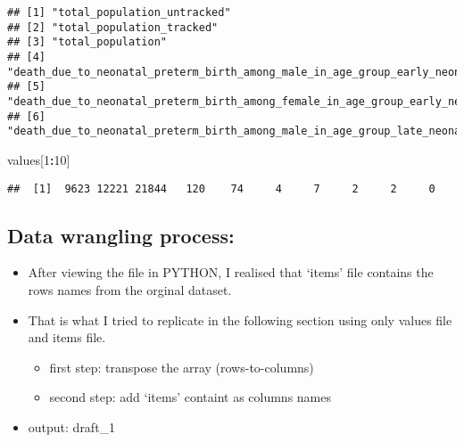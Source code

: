 \documentclass[]{article}
\newenvironment{Shaded}{\begin{snugshade}}{\end{snugshade}}
\newcommand{\DecValTok}[1]{\textcolor[rgb]{0.00,0.00,0.81}{#1}}
\newcommand{\NormalTok}[1]{#1}
\newcommand{\OperatorTok}[1]{\textcolor[rgb]{0.81,0.36,0.00}{\textbf{#1}}}
\newcommand{\StringTok}[1]{\textcolor[rgb]{0.31,0.60,0.02}{#1}}
\providecommand{\tightlist}{%
  \setlength{\itemsep}{0pt}\setlength{\parskip}{0pt}}
\begin{document}
\begin{Shaded}
\end{Shaded}

\begin{verbatim}
## [1] "total_population_untracked"                                                  
## [2] "total_population_tracked"                                                    
## [3] "total_population"                                                            
## [4] "death_due_to_neonatal_preterm_birth_among_male_in_age_group_early_neonatal"  
## [5] "death_due_to_neonatal_preterm_birth_among_female_in_age_group_early_neonatal"
## [6] "death_due_to_neonatal_preterm_birth_among_male_in_age_group_late_neonatal"
\end{verbatim}

\begin{Shaded}
\begin{Highlighting}[]
\NormalTok{values[}\DecValTok{1}\OperatorTok{:}\DecValTok{10}\NormalTok{]}
\end{Highlighting}
\end{Shaded}

\begin{verbatim}
##  [1]  9623 12221 21844   120    74     4     7     2     2     0
\end{verbatim}

\hypertarget{data-wrangling-process}{%
\subsection{Data wrangling process:}\label{data-wrangling-process}}

\begin{itemize}
\tightlist
\item
  After viewing the file in PYTHON, I realised that `items' file
  contains the rows names from the orginal dataset.
\item
  That is what I tried to replicate in the following section using only
  values file and items file.

  \begin{itemize}
  \tightlist
  \item
    first step: transpose the array (rows-to-columns)
  \item
    second step: add `items' containt as columns names
  \end{itemize}
\item
  output: draft\_1
\end{itemize}
\end{document}

